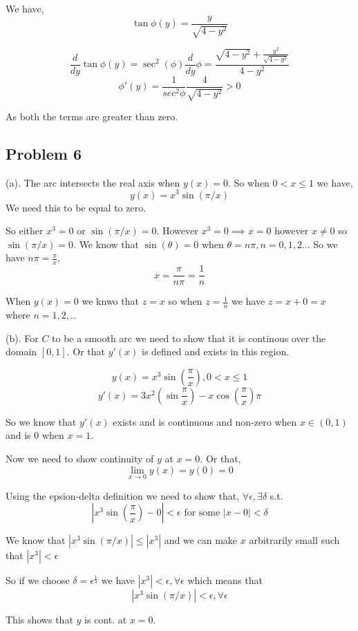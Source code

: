 \documentclass[a4paper]{report}
\begin{document}
We have, 
$$ \tan \phi(y) = \frac{y}{\sqrt{4 - y^2}}  $$ 

$$ \frac{d}{dy} \tan \phi(y) = \sec^2(\phi) \frac{d}{dy}\phi = \frac{\sqrt{4-y^2} + \frac{y^2}{\sqrt{4-y^2}}}{4-y^2} $$ 
$$\phi'(y) = \frac{1}{sec^2\phi} \frac{4}{\sqrt{4 - y^2}} > 0 $$ 

As both the terms are greater than zero.



\subsection*{Problem 6}
(a). The arc intersects the real axis when $y(x) = 0$. So when $0 < x \le 1$ we have, 
$$ y(x) = x^{3}\sin(\pi / x) $$ 
We need this to be equal to zero.

So either $x^{3} = 0$ or $\sin(\pi /x) = 0$. However $x^{3} = 0 \implies x = 0$ however $x \ne 0$ so  $\sin(\pi /x) = 0$. We know that  $\sin(\theta) = 0$ when $\theta = n\pi, n = 0,1,2...$ 
So we have $n\pi  = \frac{\pi}{x}$, 
$$ x = \frac{\pi}{n\pi} = \frac{1}{n}$$ 

When $y(x) = 0$ we knwo that $z = x$ so when $z = \frac{1}{n}$ we have $z = x + 0 = x$ where $n = 1,2,..$


(b). For  $C$ to be a smooth arc we need to show that it is continous over the domain $[0,1]$. Or that  $y'(x)$ is defined and exists in this region.

$$ y(x) = x^{3}\sin(\frac{\pi}{x}) ,  0 < x \le 1$$ 
$$ y'(x) = 3x^2(\sin\frac{\pi}{x})  - x \cos(\frac{\pi}{x})\pi$$ 

So we know that $y'(x)$ exists and is continuous and non-zero when $x \in (0,1)$ and is $0$ when $x = 1$. 


Now we need to show continuity of $y$ at $x = 0$. Or that,  
$$ \lim_{x \to 0} y(x) = y(0) = 0 $$ 

Using the epsion-delta definition we need to show that, $\forall \epsilon, \exists  \delta$ s.t.
$$ |x^{3}\sin(\frac{\pi}{x}) - 0| < \epsilon \text{ for some } | x - 0| < \delta $$ 

We know that $|x^3 \sin(\pi /x)| \le |x^{3}|$ and we can make $x$ arbitrarily small such that $|x^{3}| < \epsilon$

So if we choose  $\delta = \epsilon^{\frac{1}{3}}$ we have $|x^{3}| < \epsilon, \forall \epsilon$ which means that 
$$  |x^{3}\sin(\pi / x) | < \epsilon, \forall \epsilon$$ 

This shows that $y$ is cont. at $x=0$.
\end{document}
